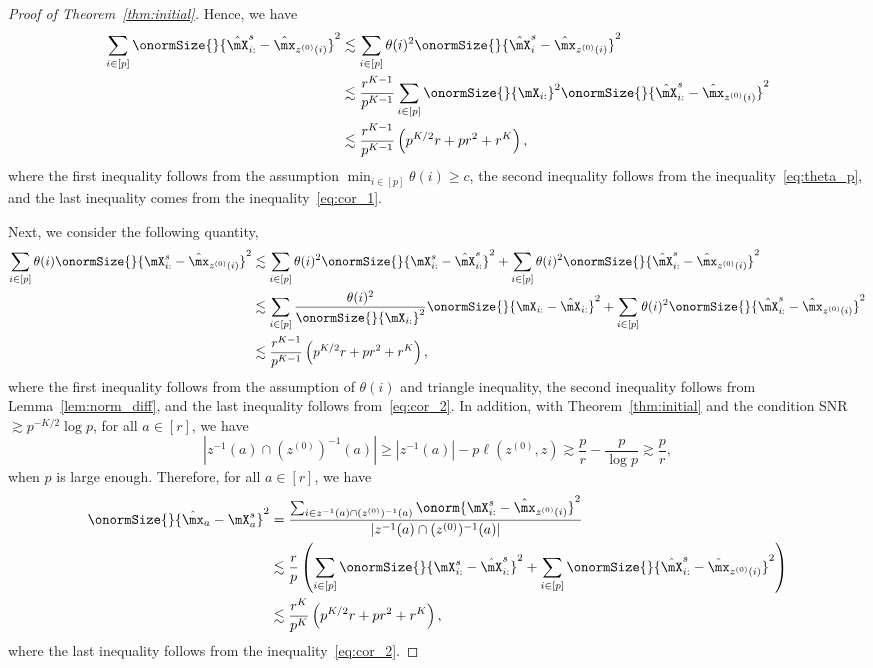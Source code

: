 \documentclass[lettersize,onecolumn,journal]{IEEEtran}
\theoremstyle{definition}
\theoremstyle{definition}
\newcommand{\of}[1]{\left(#1\right)}
\begin{document}
\begin{proof}[Proof of Theorem~\ref{thm:initial}]
Hence, we have 
\begin{align}
    \sum_{i \in [p]} \onormSize{}{\hat \mX_{i:}^s - \hat \mx_{z^{(0)}(i)}}^2 &\lesssim \sum_{i \in [p]} \theta(i)^2 \onormSize{}{\hat \mX_i^s - \hat \mx_{z^{(0)}(i)}}^2 \\
    &\lesssim \frac{r^{K-1}}{p^{K-1}} \sum_{i \in [p]} \onormSize{}{\mX_{i:}}^2 \onormSize{}{\hat \mX_{i:}^s - \hat \mx_{z^{(0)}(i)}}^2\\
    & \lesssim \frac{r^{K-1}}{p^{K-1}} \of{ p^{K/2}r + pr^2 + r^K },\label{eq:cor_2}
\end{align}
where the first inequality follows from the assumption $\min_{i \in [p]} \theta(i) \geq c$, the second inequality follows from the inequality~\eqref{eq:theta_p}, and the last inequality comes from the inequality~\eqref{eq:cor_1}.

Next, we consider the following quantity,
\begin{align}
    \sum_{i \in [p]} \theta(i) \onormSize{}{ \mX_{i:}^s - \hat \mx_{z^{(0)}(i)}}^2 &\lesssim \sum_{i \in [p]} \theta(i)^2 \onormSize{}{\mX_{i:}^s - \hat \mX_{i:}^s}^2 + \sum_{i \in [p]} \theta(i)^2 \onormSize{}{\hat \mX_{i:}^s - \hat \mx_{z^{(0)}(i)} }^2\\
    & \lesssim \sum_{i \in [p]} \frac{ \theta(i)^2}{ \onormSize{}{\mX_{i:}}^2} \onormSize{}{\mX_{i:}  - \hat \mX_{i:}}^2 +  \sum_{i \in [p]} \theta(i)^2 \onormSize{}{\hat \mX_{i:}^s - \hat \mx_{z^{(0)}(i)} }^2\\
    & \lesssim \frac{r^{K-1}}{p^{K-1}} \of{ p^{K/2}r + pr^2 + r^K} ,\label{eq:cor_3}
\end{align}
where the first inequality follows from the assumption of $\theta(i)$ and triangle inequality, the second inequality follows from Lemma~\ref{lem:norm_diff}, and the last inequality follows from~\eqref{eq:cor_2}. In addition, with Theorem~\ref{thm:initial} and the condition SNR $\gtrsim p^{-K/2} \log p$, for all $a \in [r]$, we have
\begin{equation}
    |z^{-1}(a) \cap (z^{(0)})^{-1} (a)| \geq |z^{-1}(a)| - p\ell(z^{(0)} ,  z) \gtrsim \frac{p}{r} - \frac{p}{\log p} \gtrsim \frac{p}{r},
\end{equation}
when $p$ is large enough. Therefore, for all $a \in [r]$, we have 
\begin{align}
       \onormSize{}{ \hat \mx_{a} - \mX_{a}^s  }^2  &= \frac{ \sum_{i \in z^{-1}(a) \cap (z^{(0)})^{-1} (a) } \onorm{ \mX_{i:}^s - \hat \mx_{z^{(0)}(i)}}^2 }{|z^{-1}(a) \cap (z^{(0)})^{-1} (a) |}  \\
       & \lesssim \frac{r}{p} \of{  \sum_{i \in [p]} \onormSize{}{ \mX_{i:}^s - \hat \mX_{i:}^s }^2 + \sum_{i \in [p]} \onormSize{}{\hat \mX_{i:}^s - \hat \mx_{z^{(0)}(i)}}^2 } \\
       & \lesssim  \frac{r^{K}}{p^{K}}\of{ p^{K/2}r + pr^2 + r^K}, \label{eq:cor_4}
\end{align}
where the last inequality follows from the inequality~\eqref{eq:cor_2}.


\end{proof}
\end{document}
